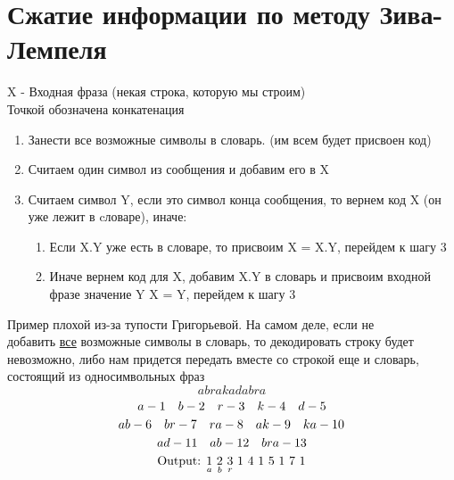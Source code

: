 \documentclass[discrete.tex]{subfiles}
\begin{document}
\section{Сжатие информации по методу Зива-Лемпеля}

\begin{definition} [Алгоритм]
    X - Входная фраза (некая строка, которую мы строим)\\
    Точкой обозначена конкатенация
    \begin{enumerate}
        \item Занести все возможные символы в словарь. (им всем будет присвоен код)
        \item Считаем один символ из сообщения и добавим его в X
        \item Считаем символ Y, если это символ конца сообщения, то вернем код X (он уже
            лежит в cловаре), иначе:
            \begin{enumerate}
                \item Если X.Y уже есть в словаре, то присвоим X = X.Y, перейдем к шагу 3
                \item Иначе вернем код для X, добавим X.Y в словарь и присвоим входной
                    фразе значение Y \q X = Y, перейдем к шагу 3
            \end{enumerate}
    \end{enumerate}
\end{definition}

\begin{example}
    Пример плохой из-за тупости Григорьевой. На самом деле, если не \\ добавить \ul{все}
    возможные символы в словарь, то декодировать строку будет невозможно, либо нам 
    придется передать вместе со строкой еще и словарь, состоящий из односимвольных фраз
    \[abrakadabra\]
    \[a - 1 \quad b - 2 \quad r - 3 \quad k - 4 \quad d - 5\]
    \[ab - 6 \quad br - 7 \quad ra - 8 \quad ak - 9 \quad ka - 10\]
    \[ad - 11 \quad ab - 12 \quad bra - 13\]
    \[\text{Output: } \us{a}{1} \ \us{b}{2} \ \us{r}{3} \ 1 \ 4 \ 1 \ 5 \ 1 \ 7 \ 1\]
\end{example}
\end{document}
